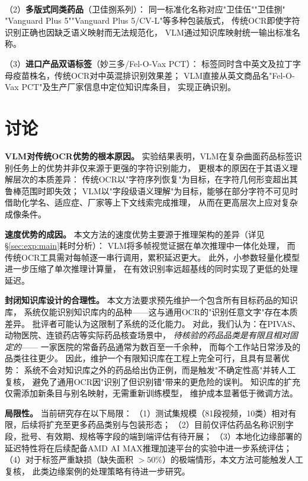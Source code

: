 \documentclass[12pt, a4paper]{article}
\begin{document}
\noindent（2）\textbf{多版式同类药品}（卫佳捌系列）：
同一标准化名称对应"卫佳\textsuperscript{\textregistered}伍""卫佳\textsuperscript{\textregistered}捌"
"Vanguard Plus 5""Vanguard Plus 5/CV-L"等多种包装版式，
传统OCR即使字符识别正确也因缺乏语义映射而无法规范化，
VLM通过知识库映射统一输出标准名称。

\noindent（3）\textbf{进口产品双语标签}（妙三多/Fel-O-Vax PCT）：
标签同时含中英文及拉丁字母疫苗株名，传统OCR对中英混排识别效果差；
VLM直接从英文商品名"Fel-O-Vax PCT"及生产厂家信息中定位知识库条目，
实现正确识别。


\section{讨论}
\label{sec:discussion}

\noindent\textbf{VLM对传统OCR优势的根本原因。}
实验结果表明，VLM在复杂曲面药品标签识别任务上的优势并非仅来源于更强的字符识别能力，
更根本的原因在于其语义理解层次的本质差异：
传统OCR以"字符序列恢复"为目标，在字符几何形变超出其鲁棒范围时即失效；
VLM以"字段级语义理解"为目标，能够在部分字符不可见时借助化学名、适应症、厂家等上下文线索完成推理，
从而在更高层次上应对复杂成像条件。

\noindent\textbf{速度优势的成因。}
本文方法的速度优势主要源于推理架构的差异（详见§\ref{sec:exp:main}耗时分析）：
VLM将多帧视觉证据在单次推理中一体化处理，
而传统OCR工具需对每帧逐一串行调用，累积延迟更大。
此外，小参数轻量化模型进一步压缩了单次推理计算量，
在有效识别率远超基线的同时实现了更低的处理延迟。

\noindent\textbf{封闭知识库设计的合理性。}
本文方法要求预先维护一个包含所有目标药品的知识库，
系统仅能识别知识库内的品种——这与通用OCR的"识别任意文字"存在本质差异。
批评者可能认为这限制了系统的泛化能力。
对此，我们认为：在PIVAS、动物医院、连锁药店等实际药品核查场景中，
\emph{待核验的药品品类是有限且相对固定的}——
一家医院的常备药品通常为数百至一千余种，
而每个工作站日常涉及的品类往往更少。
因此，维护一个有限知识库在工程上完全可行，且具有显著优势：
系统不会对知识库之外的药品给出伪正例，而是触发"不确定性高"并转人工复核，
避免了通用OCR因"识别了但识别错"带来的更危险的误判。
知识库的扩充仅需添加新条目与别名映射，无需重新训练模型，
维护成本显著低于微调方法。

\noindent\textbf{局限性。}
当前研究存在以下局限：
（1）测试集规模（81段视频，10类）相对有限，后续将扩充至更多药品类别与包装形态；
（2）目前仅评估药品名称识别字段，批号、有效期、规格等字段的端到端评估有待开展；
（3）本地化边缘部署的延迟特性将在后续配备AMD AI MAX推理加速平台的实验中进一步系统评估；
（4）对于标签严重缺损（缺失面积 $>50\%$）的极端情形，本文方法可能触发人工复核，
此类边缘案例的处理策略有待进一步研究。
\end{document}
